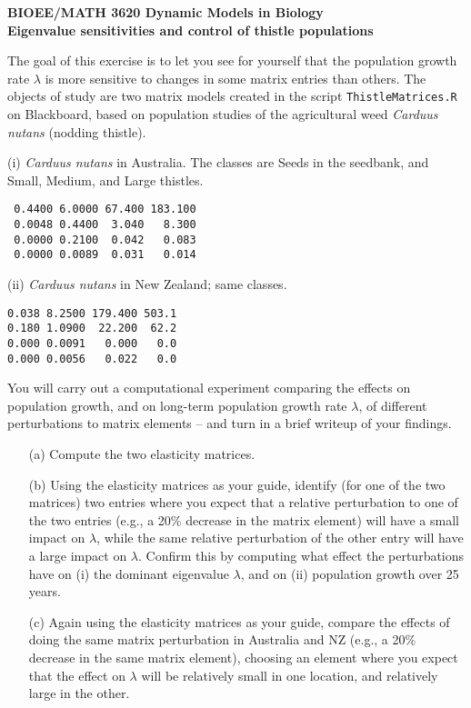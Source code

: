 \documentclass [11pt]{article}
\begin{document}
\begin{center}
\textbf{\large{BIOEE/MATH 3620 Dynamic Models in Biology}} \\
\textbf{Eigenvalue sensitivities and control of thistle populations} \\ 
\end{center}

The goal of this exercise is to let you see for yourself that the population growth rate
$\lambda$ is more sensitive to changes in some matrix entries than others. 
The objects of study are two matrix models created in the script \texttt{ThistleMatrices.R} on Blackboard, 
based on population studies of the agricultural weed \emph{Carduus nutans} (nodding thistle). 

(i) \emph{Carduus nutans} in Australia. The classes are Seeds in the seedbank, and Small, 
Medium, and Large thistles. 
\begin{verbatim} 
 0.4400 6.0000 67.400 183.100
 0.0048 0.4400  3.040   8.300
 0.0000 0.2100  0.042   0.083
 0.0000 0.0089  0.031   0.014
\end{verbatim} 

(ii) \emph{Carduus nutans} in New Zealand; same classes.  
\begin{verbatim}
0.038 8.2500 179.400 503.1
0.180 1.0900  22.200  62.2
0.000 0.0091   0.000   0.0
0.000 0.0056   0.022   0.0
\end{verbatim} 

You will carry out a computational experiment comparing the effects on population growth, and on long-term 
population growth rate $\lambda$, of different perturbations to matrix elements -- and turn in a brief writeup
of your findings. 
\begin{enumerate} 
\item[(a)] Compute the two elasticity matrices. 
\item[(b)] Using the elasticity matrices as your guide, identify (for one of the two matrices) two entries where you 
expect that a relative perturbation to one of the two entries (e.g., a 20\% decrease in the matrix element) will have a 
small impact on $\lambda$, while the same relative perturbation of the other entry will have 
a large impact on $\lambda$. Confirm this by computing what effect the perturbations have on (i) the dominant
eigenvalue $\lambda$, and on (ii) population growth over 25 years. 
\item[(c)] Again using the elasticity matrices as your guide, compare the effects of doing the same  
matrix perturbation in Australia and NZ (e.g., a 20\% decrease in the same matrix element), 
choosing an element where you expect that the effect on $\lambda$ will be relatively small in one location, and 
relatively large in the other. 
\end{enumerate} 
\end{document}
